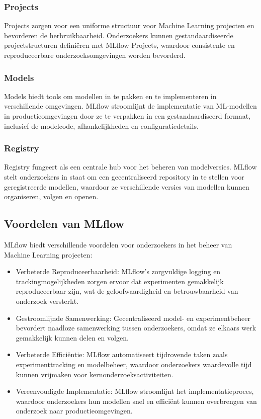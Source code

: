\subsubsection{Projects}
Projects zorgen voor een uniforme structuur voor Machine Learning projecten en bevorderen de herbruikbaarheid. Onderzoekers kunnen gestandaardiseerde projectstructuren definiëren met MLflow Projects, waardoor consistente en reproduceerbare onderzoeksomgevingen worden bevorderd.

\subsubsection{Models}
Models biedt tools om modellen in te pakken en te implementeren in verschillende omgevingen. MLflow stroomlijnt de implementatie van ML-modellen in productieomgevingen door ze te verpakken in een gestandaardiseerd formaat, inclusief de modelcode, afhankelijkheden en configuratiedetails.

\subsubsection{Registry}
Registry fungeert als een centrale hub voor het beheren van modelversies. MLflow stelt onderzoekers in staat om een gecentraliseerd repository in te stellen voor geregistreerde modellen, waardoor ze verschillende versies van modellen kunnen organiseren, volgen en openen.

\subsection{Voordelen van MLflow}

MLflow biedt verschillende voordelen voor onderzoekers in het beheer van Machine Learning projecten:

\begin{itemize}
    \item Verbeterde Reproduceerbaarheid: MLflow's zorgvuldige logging en trackingmogelijkheden zorgen ervoor dat experimenten gemakkelijk reproduceerbaar zijn, wat de geloofwaardigheid en betrouwbaarheid van onderzoek versterkt.
    \item Gestroomlijnde Samenwerking: Gecentraliseerd model- en experimentbeheer bevordert naadloze samenwerking tussen onderzoekers, omdat ze elkaars werk gemakkelijk kunnen delen en volgen.
    \item Verbeterde Efficiëntie: MLflow automatiseert tijdrovende taken zoals experimenttracking en modelbeheer, waardoor onderzoekers waardevolle tijd kunnen vrijmaken voor kernonderzoeksactiviteiten.
    \item Vereenvoudigde Implementatie: MLflow stroomlijnt het implementatieproces, waardoor onderzoekers hun modellen snel en efficiënt kunnen overbrengen van onderzoek naar productieomgevingen.
\end{itemize}


